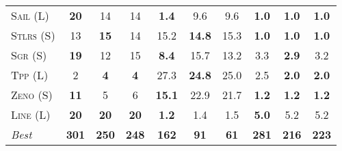 \documentclass[11pt]{article}
\begin{document}
\begin{table*}[tb]
{\begin{tabular}{|l||ccc||ccc||ccc||}
\textsc{Sail} (L)&\textbf{20}&14&14&\textbf{1.4}&9.6&9.6&\textbf{1.0}&\textbf{1.0}&\textbf{1.0}\\
\textsc{Stlrs} (S)&13&\textbf{15}&14&15.2&\textbf{14.8}&15.3&\textbf{1.0}&\textbf{1.0}&\textbf{1.0}\\
\textsc{Sgr} (S)&\textbf{19}&12&15&\textbf{8.4}&15.7&13.2&3.3&\textbf{2.9}&3.2\\
\textsc{Tpp} (L)&2&\textbf{4}&\textbf{4}&27.3&\textbf{24.8}&25.0&2.5&\textbf{2.0}&\textbf{2.0}\\
\textsc{Zeno} (S)&\textbf{11}&5&6&\textbf{15.1}&22.9&21.7&\textbf{1.2}&\textbf{1.2}&\textbf{1.2}\\
\textsc{Line} (L)&\textbf{20}&\textbf{20}&\textbf{20}&\textbf{1.2}&1.4&1.5&\textbf{5.0}&5.2&5.2
\\\hline
\textit{Best}&\textbf{301}&\textbf{250}&\textbf{248}&\textbf{162}&\textbf{91}&\textbf{61}&\textbf{281}&\textbf{216}&\textbf{223}\\\hline

        \end{tabular}}
        \caption{}
        \label{tab:all-patty}
        \end{table*}
        
\end{document}
